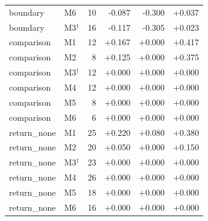 \begin{table}[!htbp]
\begin{tabular}{@{}llrrrr@{}}
boundary & M6 & 10 & -0.087 & -0.300 & +0.037 \\
boundary & M3$^\dagger$ & 16 & -0.117 & -0.305 & +0.023 \\
\midrule
comparison & M1 & 12 & +0.167 & +0.000 & +0.417 \\
comparison & M2 & 8 & +0.125 & +0.000 & +0.375 \\
comparison & M3$^\dagger$ & 12 & +0.000 & +0.000 & +0.000 \\
comparison & M4 & 12 & +0.000 & +0.000 & +0.000 \\
comparison & M5 & 8 & +0.000 & +0.000 & +0.000 \\
comparison & M6 & 6 & +0.000 & +0.000 & +0.000 \\
\midrule
return\_none & M1 & 25 & $\mathbf{+0.220}$ & $\mathbf{+0.080}$ & $\mathbf{+0.380}$ \\
return\_none & M2 & 20 & +0.050 & +0.000 & +0.150 \\
return\_none & M3$^\dagger$ & 23 & +0.000 & +0.000 & +0.000 \\
return\_none & M4 & 26 & +0.000 & +0.000 & +0.000 \\
return\_none & M5 & 18 & +0.000 & +0.000 & +0.000 \\
return\_none & M6 & 16 & +0.000 & +0.000 & +0.000 \\
\bottomrule
\end{tabular}
\end{table}